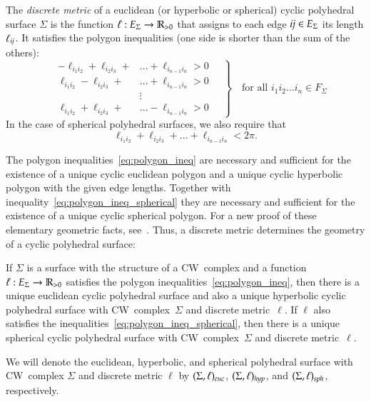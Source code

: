 \documentclass[Thesis]{subfiles}
\begin{document}
The \emph{discrete metric} of a euclidean (or hyperbolic or spherical)
cyclic polyhedral surface $\Sigma$ is the function
$\ell:E_{\Sigma}\rightarrow\mathbb R_{>0}$ that assigns to each edge ${\it ij}
\in E_{\Sigma}$ its length $\ell_{\it ij}$.  It satisfies the polygon
inequalities (one side is shorter than the sum of the others):
\begin{equation}
\label{eq:polygon_ineq}
\left.
\quad
\begin{aligned}
-\ell_{i_{1}i_{2}}+\ell_{i_{2}i_{3}}+&\ldots+\ell_{i_{n-1}i_{n}}
>0\\
\ell_{i_{1}i_{2}}-\ell_{i_{2}i_{3}}+&\ldots+\ell_{i_{n-1}i_{n}}
>0\\
&\vdots\\
\ell_{i_{1}i_{2}}+\ell_{i_{2}i_{3}}+&\ldots-\ell_{i_{n-1}i_{n}}
>0
\end{aligned}
\quad
\right\}
\quad
\text{for all $i_{1}i_{2}\ldots i_{n}\in F_{\Sigma}$}
\end{equation}
In the case of spherical polyhedral surfaces, we also require that
\begin{equation}
  \label{eq:polygon_ineq_spherical}
  \ell_{i_{1}i_{2}}+\ell_{i_{2}i_{3}}+\ldots+\ell_{i_{n-1}i_{n}}
<2\pi.
\end{equation}

The polygon inequalities~\eqref{eq:polygon_ineq} are necessary and
sufficient for the existence of a unique cyclic euclidean polygon and
a unique cyclic hyperbolic polygon with the given edge
lengths. Together with inequality~\eqref{eq:polygon_ineq_spherical}
they are necessary and sufficient for the existence of a unique cyclic
spherical polygon. For a new proof of these elementary geometric
facts, see~\cite{KSS15}. Thus, a discrete metric determines the geometry of
a cyclic polyhedral surface:

\begin{propdef}
  \label{def:sigma_ell_g}
  If $\Sigma$ is a surface with the structure of a CW~complex and a
  function $\ell:E_{\Sigma}\rightarrow\mathbb R_{>0}$ satisfies the polygon
  inequalities~\eqref{eq:polygon_ineq}, then there is a unique
  euclidean cyclic polyhedral surface and also a unique hyperbolic
  cyclic polyhedral surface with CW~complex~$\Sigma$ and discrete
  metric~$\ell$. If $\ell$ also satisfies the
  inequalities~\eqref{eq:polygon_ineq_spherical}, then there is a
  unique spherical cyclic polyhedral surface with CW~complex~$\Sigma$
  and discrete metric~$\ell$. 

  We will denote the euclidean, hyperbolic, and spherical polyhedral
  surface with CW~complex $\Sigma$ and discrete metric $\ell$ by\/
  $(\Sigma,\ell)_{\euc}$, $(\Sigma,\ell)_{\mathit{hyp}}$, and\/
  $(\Sigma,\ell)_{\mathit{sph}}$, respectively.
\end{propdef}
\end{document}

